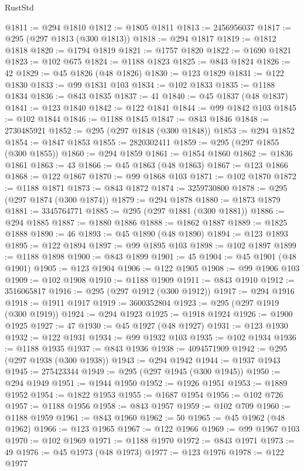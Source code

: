 \begin{lexlean}{RustStd}
\begin{coremodule}
{\begin{coremodule}
{{{{{{{{{{{{{{{{{{{{{{{{{{{{{{{{{@1811 := @294 @1810
@1812 := @1805 @1811
@1813 := 2456956037
@1817 := @295 (@297 @1813 (@300 @1813))
@1818 := @294 @1817
@1819 := @1812 @1818
@1820 := @1794 @1819
@1821 := @1757 @1820
@1822 := @1690 @1821
@1823 := @102 @675
@1824 := @1188 @1823
@1825 := @843 @1824
@1826 := 42
@1829 := @45 @1826 (@48 @1826)
@1830 := @123 @1829
@1831 := @122 @1830
@1833 := @99 @1831 @103
@1834 := @102 @1833
@1835 := @1188 @1834
@1836 := @843 @1835
@1837 := 41
@1840 := @45 @1837 (@48 @1837)
@1841 := @123 @1840
@1842 := @122 @1841
@1844 := @99 @1842 @103
@1845 := @102 @1844
@1846 := @1188 @1845
@1847 := @843 @1846
@1848 := 2730485921
@1852 := @295 (@297 @1848 (@300 @1848))
@1853 := @294 @1852
@1854 := @1847 @1853
@1855 := 2820302411
@1859 := @295 (@297 @1855 (@300 @1855))
@1860 := @294 @1859
@1861 := @1854 @1860
@1862 := @1836 @1861
@1863 := 43
@1866 := @45 @1863 (@48 @1863)
@1867 := @123 @1866
@1868 := @122 @1867
@1870 := @99 @1868 @103
@1871 := @102 @1870
@1872 := @1188 @1871
@1873 := @843 @1872
@1874 := 3259730800
@1878 := @295 (@297 @1874 (@300 @1874))
@1879 := @294 @1878
@1880 := @1873 @1879
@1881 := 3345764771
@1885 := @295 (@297 @1881 (@300 @1881))
@1886 := @294 @1885
@1887 := @1880 @1886
@1888 := @1862 @1887
@1889 := @1825 @1888
@1890 := 46
@1893 := @45 @1890 (@48 @1890)
@1894 := @123 @1893
@1895 := @122 @1894
@1897 := @99 @1895 @103
@1898 := @102 @1897
@1899 := @1188 @1898
@1900 := @843 @1899
@1901 := 45
@1904 := @45 @1901 (@48 @1901)
@1905 := @123 @1904
@1906 := @122 @1905
@1908 := @99 @1906 @103
@1909 := @102 @1908
@1910 := @1188 @1909
@1911 := @843 @1910
@1912 := 3516065817
@1916 := @295 (@297 @1912 (@300 @1912))
@1917 := @294 @1916
@1918 := @1911 @1917
@1919 := 3600352804
@1923 := @295 (@297 @1919 (@300 @1919))
@1924 := @294 @1923
@1925 := @1918 @1924
@1926 := @1900 @1925
@1927 := 47
@1930 := @45 @1927 (@48 @1927)
@1931 := @123 @1930
@1932 := @122 @1931
@1934 := @99 @1932 @103
@1935 := @102 @1934
@1936 := @1188 @1935
@1937 := @843 @1936
@1938 := 4094571909
@1942 := @295 (@297 @1938 (@300 @1938))
@1943 := @294 @1942
@1944 := @1937 @1943
@1945 := 275423344
@1949 := @295 (@297 @1945 (@300 @1945))
@1950 := @294 @1949
@1951 := @1944 @1950
@1952 := @1926 @1951
@1953 := @1889 @1952
@1954 := @1822 @1953
@1955 := @1687 @1954
@1956 := @102 @726
@1957 := @1188 @1956
@1958 := @843 @1957
@1959 := @102 @709
@1960 := @1188 @1959
@1961 := @843 @1960
@1962 := 50
@1965 := @45 @1962 (@48 @1962)
@1966 := @123 @1965
@1967 := @122 @1966
@1969 := @99 @1967 @103
@1970 := @102 @1969
@1971 := @1188 @1970
@1972 := @843 @1971
@1973 := 49
@1976 := @45 @1973 (@48 @1973)
@1977 := @123 @1976
@1978 := @122 @1977
}}}}}}}}}}}}}}}}}}}}}}}}}}}}}}}}}
\end{coremodule}}
\end{coremodule}
\end{lexlean}

